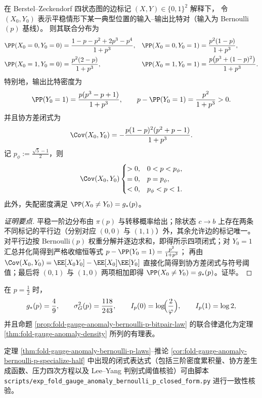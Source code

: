 \begin{proposition}\label{prop:fold-gauge-anomaly-bernoulli-p-bitpair-law}
在 Berstel--Zeckendorf 四状态图的边标记 \((X,Y)\in\{0,1\}^2\) 解释下，
令 \((X_0,Y_0)\) 表示平稳情形下某一典型位置的输入--输出比特对（输入为 Bernoulli\((p)\) 基线）。
则其联合分布为
\begin{align*}
\PP(X_0=0,Y_0=0)&=\frac{1 - p - p^2 + 2p^3 - p^4}{1+p^3},&
\PP(X_0=0,Y_0=1)&=\frac{p^2(1-p)}{1+p^3},\\
\PP(X_0=1,Y_0=0)&=\frac{p^2(2-p)}{1+p^3},&
\PP(X_0=1,Y_0=1)&=\frac{p\bigl(p^3+(1-p)^2\bigr)}{1+p^3}.
\end{align*}
特别地，输出比特密度为
\[
\PP(Y_0=1)=\frac{p(p^3-p+1)}{1+p^3},
\qquad
p-\PP(Y_0=1)=\frac{p^2}{1+p^3}>0.
\]
并且协方差闭式为
\[
\Cov(X_0,Y_0)
=-\frac{p(1-p)^2(p^2+p-1)}{1+p^3}.
\]
记 \(p_\phi:=\frac{\sqrt5-1}{2}\)，则
\[
\Cov(X_0,Y_0)
\begin{cases}
>0,& 0<p<p_\phi,\\
=0,& p=p_\phi,\\
<0,& p_\phi<p<1.
\end{cases}
\]
此外，失配密度满足 \(\PP(X_0\neq Y_0)=g_\ast(p)\)。
\end{proposition}
\begin{proof}[证明要点]
平稳一阶边分布由 \(\pi(p)\) 与转移概率给出；除状态 \(c\to b\) 上存在两条不同标记的平行边（分别对应 \((0,0)\) 与 \((1,1)\)）外，其余允许边的标记唯一。
对平行边按 Bernoulli\((p)\) 权重分解并逐边求和，即得所示四项闭式；对 \(Y_0=1\) 汇总并化简得到严格收缩恒等式
\(p-\PP(Y_0=1)=\frac{p^2}{1+p^3}\)；
再由 \(\Cov(X_0,Y_0)=\EE[X_0Y_0]-\EE[X_0]\EE[Y_0]\) 直接化简得到协方差闭式与符号阈值；最后将 \((0,1)\) 与 \((1,0)\) 两项相加即得 \(\PP(X_0\neq Y_0)=g_\ast(p)\)。证毕。
\end{proof}

\begin{corollary}[均匀基线作为特例：\texorpdfstring{$p=\tfrac12$}{p=1/2}]\label{cor:fold-gauge-anomaly-bernoulli-p-specialize-half}
在 \(p=\tfrac12\) 时，
\[
g_\ast(p)=\frac49,\qquad \sigma_G^2(p)=\frac{118}{243},
\qquad
I_p(0)=\log\!\Bigl(\frac{2}{\varphi}\Bigr),\qquad I_p(1)=\log 2,
\]
并且命题 \ref{prop:fold-gauge-anomaly-bernoulli-p-bitpair-law} 的联合律退化为定理 \ref{thm:fold-gauge-anomaly-density} 所列的有理表。
\end{corollary}


\begin{remark}[审计脚本]\label{rem:fold-gauge-anomaly-bernoulli-p-audit-script}
定理 \ref{thm:fold-gauge-anomaly-bernoulli-p-laws}--推论 \ref{cor:fold-gauge-anomaly-bernoulli-p-specialize-half} 中出现的闭式表达式（包括三阶密度累积量、协方差生成函数、压力四次方程以及 Lee--Yang 判别式阈值核验）可由脚本 \texttt{scripts/exp\_fold\_gauge\_anomaly\_bernoulli\_p\_closed\_form.py} 进行一致性核验。
\end{remark}
\endinput
